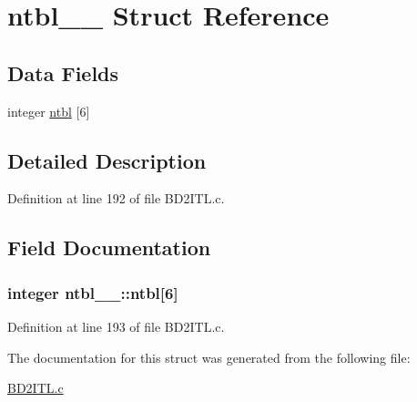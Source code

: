 \hypertarget{structntbl__1__}{}\section{ntbl\+\_\+\_\+ Struct Reference}
\label{structntbl__1__}
\subsection*{Data Fields}
\begin{DoxyCompactItemize}
\item 
integer \hyperlink{structntbl__1___acc2b4e96a51573bae2a14950789e7c77}{ntbl} \mbox{[}6\mbox{]}
\end{DoxyCompactItemize}


\subsection{Detailed Description}


Definition at line 192 of file B\+D2\+I\+T\+L.\+c.



\subsection{Field Documentation}
\subsubsection[{\texorpdfstring{ntbl}{ntbl}}]{\setlength{\rightskip}{0pt plus 5cm}integer ntbl\+\_\+\_\+\+::ntbl\mbox{[}6\mbox{]}}\hypertarget{structntbl__1___acc2b4e96a51573bae2a14950789e7c77}{}\label{structntbl__1___acc2b4e96a51573bae2a14950789e7c77}


Definition at line 193 of file B\+D2\+I\+T\+L.\+c.



The documentation for this struct was generated from the following file\+:\begin{DoxyCompactItemize}
\item 
\hyperlink{BD2ITL_8c}{B\+D2\+I\+T\+L.\+c}\end{DoxyCompactItemize}
